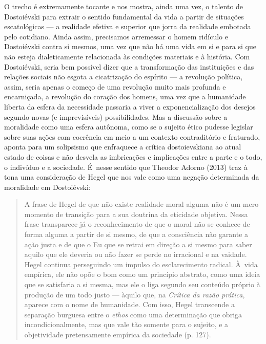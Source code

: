 O trecho é extremamente tocante e nos mostra, ainda uma vez, o talento
de Dostoiévski para extrair o sentido fundamental da vida a partir de
situações escatológicas --- a realidade efetiva e superior que jorra da
realidade embotada pelo cotidiano. Ainda assim, precisamos arremessar o
homem ridículo e Dostoiévski contra si mesmos, uma vez que não há uma
vida em si e para si que não esteja dialeticamente relacionada às
condições materiais e à história. Com Dostoiévski, seria bem possível
dizer que a transformação das instituições e das relações sociais não
esgota a cicatrização do espírito --- a revolução política, assim, seria
apenas o começo de uma revolução muito mais profunda e encarniçada, a
revolução do coração dos homens, uma vez que a humanidade liberta da
esfera da necessidade passaria a viver a exponencialização dos desejos
segundo novas (e imprevisíveis) possibilidades. Mas a discussão sobre a
moralidade como uma esfera autônoma, como se o sujeito ético pudesse
legislar sobre suas ações com coerência em meio a um contexto
contraditório e fraturado, aponta para um solipsismo que enfraquece a
crítica dostoievskiana ao atual estado de coisas e não desvela as
imbricações e implicações entre a parte e o todo, o indivíduo e a
sociedade. É~nesse sentido que Theodor Adorno (2013) traz à tona uma
consideração de Hegel que nos vale como uma negação determinada da
moralidade em Dostoiévski:

\begin{quote}
A frase de Hegel de que não existe realidade moral alguma não é um mero
momento de transição para a sua doutrina da eticidade objetiva. Nessa
frase transparece já o reconhecimento de que o moral não se conhece de
forma alguma a partir de si mesmo, de que a consciência não garante a
ação justa e de que o Eu que se retrai em direção a si mesmo para saber
aquilo que ele deveria ou não fazer se perde no irracional e na vaidade.
Hegel continua perseguindo um impulso do esclarecimento radical. À~vida
empírica, ele não opõe o bom como um princípio abstrato, como uma ideia
que se satisfaria a si mesma, mas ele o liga segundo seu conteúdo
próprio à produção de um todo justo --- àquilo que, na \emph{Crítica da
razão prática}, aparece com o nome de humanidade. Com isso, Hegel
transcende a separação burguesa entre o \emph{ethos} como uma
determinação que obriga incondicionalmente, mas que vale tão somente
para o sujeito, e a objetividade pretensamente empírica da sociedade (p.
127).
\end{quote}

